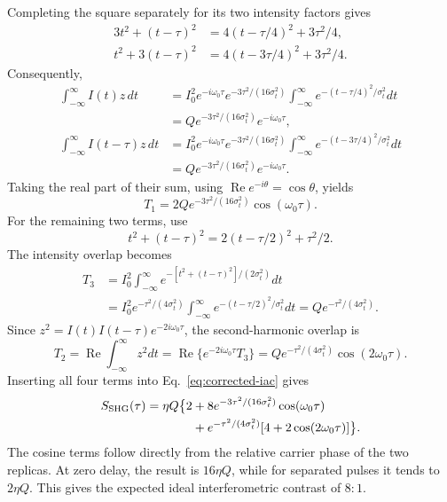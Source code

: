 Completing the square separately for its two intensity factors gives
\begin{align}
3t^2+(t-\tau)^2&=4(t-\tau/4)^2+3\tau^2/4,\\
t^2+3(t-\tau)^2&=4(t-3\tau/4)^2+3\tau^2/4.
\end{align}
Consequently,
\begin{align}
\int_{-\infty}^{\infty}I(t)z\,dt
&=I_0^2e^{-i\omega_0\tau}e^{-3\tau^2/(16\sigma_t^2)}
\int_{-\infty}^{\infty}e^{-(t-\tau/4)^2/\sigma_t^2}dt\\
&=Qe^{-3\tau^2/(16\sigma_t^2)}e^{-i\omega_0\tau},\\
\int_{-\infty}^{\infty}I(t-\tau)z\,dt
&=I_0^2e^{-i\omega_0\tau}e^{-3\tau^2/(16\sigma_t^2)}
\int_{-\infty}^{\infty}e^{-(t-3\tau/4)^2/\sigma_t^2}dt\\
&=Qe^{-3\tau^2/(16\sigma_t^2)}e^{-i\omega_0\tau}.
\end{align}
Taking the real part of their sum, using $\operatorname{Re}e^{-i\theta}=\cos\theta$, yields
\begin{equation}
T_1=2Qe^{-3\tau^2/(16\sigma_t^2)}\cos(\omega_0\tau).
\end{equation}
For the remaining two terms, use
\begin{equation}
t^2+(t-\tau)^2=2(t-\tau/2)^2+\tau^2/2.
\end{equation}
The intensity overlap becomes
\begin{align}
T_3&=I_0^2\int_{-\infty}^{\infty}
e^{-[t^2+(t-\tau)^2]/(2\sigma_t^2)}dt\\
&=I_0^2e^{-\tau^2/(4\sigma_t^2)}
\int_{-\infty}^{\infty}e^{-(t-\tau/2)^2/\sigma_t^2}dt
=Qe^{-\tau^2/(4\sigma_t^2)}.
\end{align}
Since $z^2=I(t)I(t-\tau)e^{-2i\omega_0\tau}$, the second-harmonic overlap is
\begin{equation}
T_2=\operatorname{Re}\int_{-\infty}^{\infty}z^2dt
=\operatorname{Re}\{e^{-2i\omega_0\tau}T_3\}
=Qe^{-\tau^2/(4\sigma_t^2)}\cos(2\omega_0\tau).
\end{equation}
Inserting all four terms into Eq.~\eqref{eq:corrected-iac} gives
\begin{equation}\label{eq:gaussian-iac}
\begin{aligned}
S_{\rm SHG}(\tau)=\eta Q\bigl\{2
&+8e^{-3\tau^2/(16\sigma_t^2)}\cos(\omega_0\tau)\\
&+e^{-\tau^2/(4\sigma_t^2)}
[4+2\cos(2\omega_0\tau)]\bigr\}.
\end{aligned}
\end{equation}
The cosine terms follow directly from the relative carrier phase of the two replicas. At zero delay, the result is $16\eta Q$, while for separated pulses it tends to $2\eta Q$. This gives the expected ideal interferometric contrast of $8:1$.

